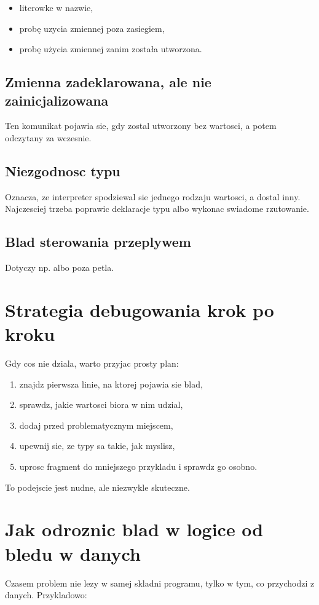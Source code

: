 \begin{itemize}
  \item literowke w nazwie,
  \item probę uzycia zmiennej poza zasiegiem,
  \item probę użycia zmiennej zanim została utworzona.
\end{itemize}

\subsection*{Zmienna zadeklarowana, ale nie zainicjalizowana}
Ten komunikat pojawia sie, gdy  zostal utworzony bez wartosci, a potem odczytany
za wczesnie.

\subsection*{Niezgodnosc typu}
Oznacza, ze interpreter spodziewal sie jednego rodzaju wartosci, a dostal inny.
Najczesciej trzeba poprawic deklaracje typu albo wykonac swiadome rzutowanie.

\subsection*{Blad sterowania przeplywem}
Dotyczy np.  albo  poza petla.

\section{Strategia debugowania krok po kroku}
Gdy cos nie dziala, warto przyjac prosty plan:

\begin{enumerate}
  \item znajdz pierwsza linie, na ktorej pojawia sie blad,
  \item sprawdz, jakie wartosci biora w nim udzial,
  \item dodaj  przed problematycznym miejscem,
  \item upewnij sie, ze typy sa takie, jak myslisz,
  \item uprosc fragment do mniejszego przykladu i sprawdz go osobno.
\end{enumerate}

To podejscie jest nudne, ale niezwykle skuteczne.

\section{Jak odroznic blad w logice od bledu w danych}
Czasem problem nie lezy w samej skladni programu, tylko w tym, co przychodzi z danych.
Przykladowo:

